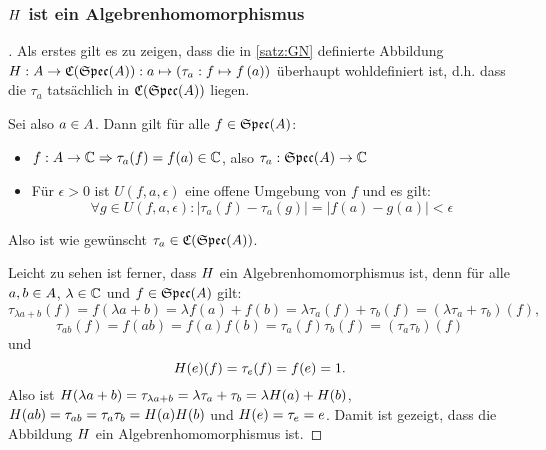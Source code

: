 \subsubsection{$H$ ist ein Algebrenhomomorphismus}\label{sec:Algebrenhomomorphismus}

\begin{proof}[]Als erstes gilt es zu zeigen, dass die in \cref{satz:GN} definierte Abbildung $H: A \to \mathfrak{C}(\mathfrak{Spec}(A)): a \mapsto \left(\tau_a: f \mapsto f\left(a\right)\right)$ überhaupt wohldefiniert ist, d.h. dass die $\tau_a$ tatsächlich in $\mathfrak{C}(\mathfrak{Spec}(A))$ liegen.

Sei also $a \in A$. Dann gilt für alle $f \in \mathfrak{Spec}(A)$:
\begin{itemize}
	\item $f: A \to \mathbb{C} \Rightarrow \tau_a(f) = f(a) \in \mathbb{C}$, also $\tau_a: \mathfrak{Spec}(A) \to \mathbb{C}$
	\item Für $\epsilon > 0$ ist $U(f, a, \epsilon)$ eine offene Umgebung von $f$ und es gilt:
		\[\forall g \in U(f, a, \epsilon): |\tau_a(f) - \tau_a(g)| = |f(a) - g(a)| < \epsilon\]
\end{itemize}
Also ist wie gewünscht $\tau_a \in \mathfrak{C}(\mathfrak{Spec}(A))$.

Leicht zu sehen ist ferner, dass $H$ ein Algebrenhomomorphismus ist, denn für alle $a, b \in A$, $\lambda \in \mathbb{C}$ und $f \in \mathfrak{Spec}(A)$ gilt:
	\[\tau_{\lambda a + b}(f) = f(\lambda a + b) = \lambda f(a) + f(b) = \lambda \tau_a(f) + \tau_b(f) = \left(\lambda \tau_a + \tau_b\right)(f),\]
	\[\tau_{ab}(f) = f(ab) = f(a)f(b) = \tau_a(f)\tau_b(f) = (\tau_a\tau_b)(f)\]
und
	\[H(e)(f) = \tau_e(f) = f(e) = 1.\]
Also ist $H(\lambda a + b) = \tau_{\lambda a + b} = \lambda \tau_a + \tau_b = \lambda H(a) + H(b)$, $H(ab) = \tau_{ab} = \tau_a\tau_b = H(a)H(b)$ und $H(e) = \tau_e = e$. Damit ist gezeigt, dass die Abbildung $H$ ein Algebrenhomomorphismus ist.

\let\qed\relax
\end{proof}